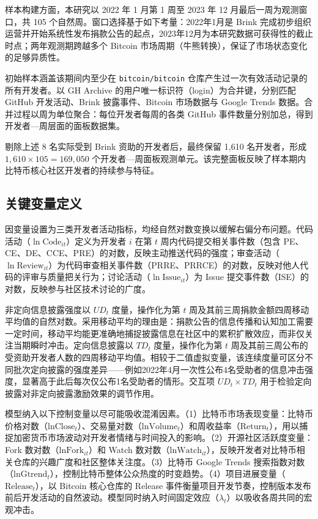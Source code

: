\documentclass[
    type = master, %
    degree = professional,        %
    decl-page,  %
    twoside,                %
    fontset = fandol %
  ]{njuthesis}
\begin{document}
样本构建方面，本研究以 2022 年 1 月第 1 周至 2023 年 12 月最后一周为观测窗口，共 105 个自然周。窗口选择基于如下考量：2022年1月是 Brink 完成初步组织运营并开始系统性发布捐款公告的起点，2023年12月为本研究数据可获得性的截止时点；两年观测期跨越多个 Bitcoin 市场周期（牛熊转换），保证了市场状态变化的足够异质性。

初始样本涵盖该期间内至少在 \texttt{bitcoin/bitcoin} 仓库产生过一次有效活动记录的所有开发者。以 GH Archive 的用户唯一标识符（login）为合并键，分别匹配 GitHub 开发活动、Brink 披露事件、Bitcoin 市场数据与 Google Trends 数据。合并过程以周为单位聚合：每位开发者每周的各类 GitHub 事件数量分别加总，得到开发者—周层面的面板数据集。

剔除上述 8 名实际受到 Brink 资助的开发者后，最终保留 1,610 名开发者，形成 $1{,}610 \times 105 = 169{,}050$ 个开发者—周面板观测单元。该完整面板反映了样本期内比特币核心社区开发者的持续参与特征。

\subsection{关键变量定义}

因变量设置为三类开发者活动指标，均经自然对数变换以缓解右偏分布问题。代码活动（$\ln\text{Code}_{it}$）定义为开发者 $i$ 在第 $t$ 周内代码提交相关事件数（包含 PE、CE、DE、CCE、PRE）的对数，反映主动推送代码的强度；审查活动（$\ln\text{Review}_{it}$）为代码审查相关事件数（PRRE、PRRCE）的对数，反映对他人代码的评审与质量把关行为；讨论活动（$\ln\text{Issue}_{it}$）为 Issue 提交事件数（ISE）的对数，反映参与社区技术讨论的广度。

非定向信息披露强度以 $UD_t$ 度量，操作化为第 $t$ 周及其前三周捐款金额四周移动平均值的自然对数。采用移动平均的理由是：捐款公告的信息传播和认知加工需要一定时间，移动平均能更准确地捕捉披露信息在社区中的累积扩散效应，而非仅关注当期瞬时冲击。定向信息披露以 $TD_t$ 度量，操作化为第 $t$ 周及其前三周公布的受资助开发者人数的四周移动平均值。相较于二值虚拟变量，该连续度量可区分不同批次定向披露的强度差异——例如2022年4月一次性公布4名受助者的信息冲击强度，显著高于此后每次仅公布1名受助者的情形。交互项 $UD_t \times TD_t$ 用于检验定向披露对非定向披露激励效果的调节作用。

模型纳入以下控制变量以尽可能吸收混淆因素。（1）比特币市场表现变量：比特币价格对数（$\text{lnClose}_t$）、交易量对数（$\text{lnVolume}_t$）和周收益率（$\text{Return}_t$），用以捕捉加密货币市场波动对开发者情绪与时间投入的影响。（2）开源社区活跃度变量：Fork 数对数（$\text{lnFork}_{it}$）和 Watch 数对数（$\text{lnWatch}_{it}$），反映开发者对比特币相关仓库的兴趣广度和社区整体关注度。（3）比特币 Google Trends 搜索指数对数（$\text{lnGtrend}_t$），控制比特币整体公众热度的时变趋势。（4）项目进展变量（$\text{Release}_t$），以 Bitcoin 核心仓库的 Release 事件衡量项目开发节奏，控制版本发布前后开发活动的自然波动。模型同时纳入时间固定效应（$\lambda_t$）以吸收各周共同的宏观冲击。
\end{document}
